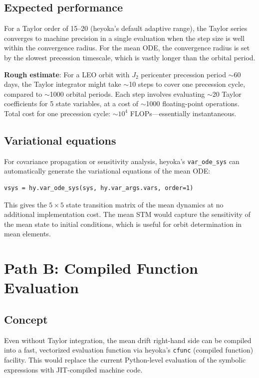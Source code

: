 \documentclass[11pt]{article}
\begin{document}
\subsection{Expected performance}

For a Taylor order of 15--20 (heyoka's default adaptive range), the Taylor
series converges to machine precision in a single evaluation when the step
size is well within the convergence radius. For the mean ODE, the
convergence radius is set by the slowest precession timescale, which is
vastly longer than the orbital period.

\textbf{Rough estimate}: For a LEO orbit with $J_2$ pericenter precession
period $\sim$60 days, the Taylor integrator might take $\sim$10 steps to
cover one precession cycle, compared to $\sim$1000 orbital periods. Each
step involves evaluating $\sim$20 Taylor coefficients for 5 state variables,
at a cost of $\sim$1000 floating-point operations. Total cost for one
precession cycle: $\sim 10^4$ FLOPs---essentially instantaneous.

\subsection{Variational equations}

For covariance propagation or sensitivity analysis, heyoka's
\texttt{var\_ode\_sys} can automatically generate the variational equations
of the mean ODE:
\begin{verbatim}
vsys = hy.var_ode_sys(sys, hy.var_args.vars, order=1)
\end{verbatim}
This gives the $5 \times 5$ state transition matrix of the mean dynamics at
no additional implementation cost. The mean STM would capture the
sensitivity of the mean state to initial conditions, which is useful for
orbit determination in mean elements.


\section{Path B: Compiled Function Evaluation}

\subsection{Concept}

Even without Taylor integration, the mean drift right-hand side can be
compiled into a fast, vectorized evaluation function via heyoka's
\texttt{cfunc} (compiled function) facility. This would replace the current
Python-level evaluation of the symbolic expressions with JIT-compiled machine
code.
\end{document}
